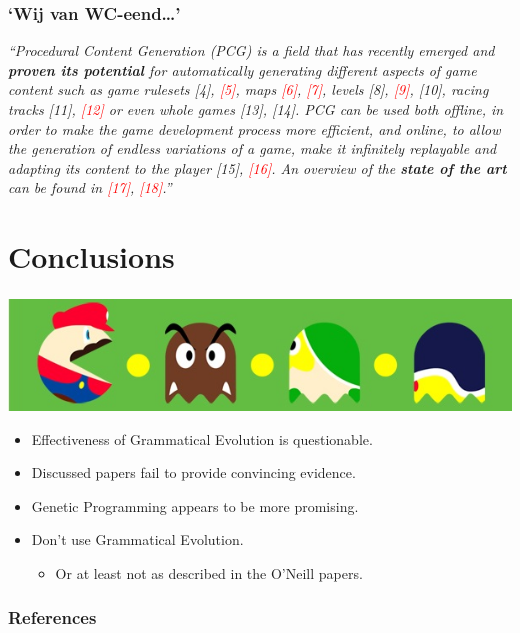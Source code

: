 \documentclass{beamer}
\makeatletter
\newcommand*{\currentname}{\@currentlabelname}
\makeatother
\begin{document}
\begin{frame}
\frametitle{`Wij van WC-eend\ldots'}
\textit{``Procedural Content Generation (PCG) is a field that has
recently emerged and \textbf{proven its potential} for automatically
generating different aspects of game content such as game
rulesets [4], \textcolor<2>{red}{[5]}, maps \textcolor<2>{red}{[6]}, \textcolor<2>{red}{[7]}, levels [8], \textcolor<2>{red}{[9]}, [10], racing
tracks [11], \textcolor<2>{red}{[12]} or even whole games [13], [14]. PCG can
be used both offline, in order to make the game development
process more efficient, and online, to allow the generation of
endless variations of a game, make it infinitely replayable and
adapting its content to the player [15], \textcolor<2>{red}{[16]}. An overview of
the \textbf{state of the art} can be found in \textcolor<2>{red}{[17]}, \textcolor<2>{red}{[18]}.''} \cite{shaker2012evolving}
\end{frame}

\section{Conclusions}
\begin{frame}
\frametitle{\currentname}

\begin{center}
	\includegraphics[scale=0.5]{pacmario.jpg}
\end{center}

\begin{itemize}
\item Effectiveness of Grammatical Evolution is questionable.
\item Discussed papers fail to provide convincing evidence.
\item Genetic Programming appears to be more promising.
\vspace*{2em}
\item<2-> Don't use Grammatical Evolution.
\begin{itemize}
\item Or at least not as described in the O'Neill papers.
\end{itemize}
\end{itemize}
\end{frame}

\begin{frame}
\frametitle{References}
\small


\end{frame}
\end{document}
